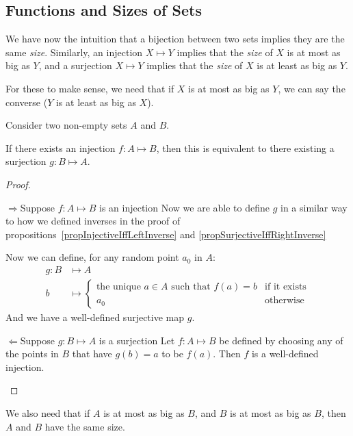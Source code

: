 \documentclass[../Main.tex]{subfiles}
\begin{document}
\subsection{Functions and Sizes of Sets}
We have now the intuition that a bijection between two sets implies they are the same \textit{size}. Similarly, an injection $X \mapsto Y$ implies that the \textit{size} of $X$ is at most as big as $Y$, and a surjection $X \mapsto Y$ implies that the \textit{size} of $X$ is at least as big as $Y$.\par
For these to make sense, we need that if $X$ is at most as big as $Y$, we can say the converse ($Y$ is at least as big as $X$).
\begin{lemma}
    Consider two non-empty sets $A$ and $B$.\par
    If there exists an injection $f : A \mapsto B$, then this is equivalent to there existing a surjection $g : B \mapsto A$.
\end{lemma}
\begin{proof}
    \begin{proofdirection}{$\Rightarrow$}{Suppose $f : A \mapsto B$ is an injection}
        Now we are able to define $g$ in a similar way to how we defined inverses in the proof of propositions~\ref{propInjectiveIffLeftInverse} and \ref{propSurjectiveIffRightInverse}\par
        Now we can define, for any random point $a_0$ in $A$:
        \begin{align*}
            g : B &\mapsto A \\
            b &\mapsto \begin{cases}
                \text{the unique } a \in A \text{ such that } f(a) = b & \text{if it exists} \\
                a_0 & \text{otherwise}
            \end{cases}
        \end{align*}
        And we have a well-defined surjective map $g$.
    \end{proofdirection}
    \begin{proofdirection}{$\Leftarrow$}{Suppose $g : B \mapsto A$ is a surjection}
        Let $f : A \mapsto B$ be defined by choosing any of the points in $B$ that have $g(b) = a$ to be $f(a)$. Then $f$ is a well-defined injection.
    \end{proofdirection}
\end{proof}
We also need that if $A$ is at most as big as $B$, and $B$ is at most as big as $B$, then $A$ and $B$ have the same size.
\end{document}
